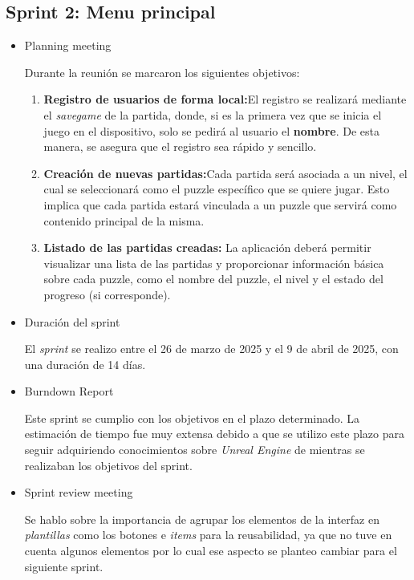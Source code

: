 \subsection{\textbf{Sprint 2: Menu principal } }
\begin{itemize}
    \item {Planning meeting}
    
    Durante la reunión se marcaron los siguientes objetivos:
    \begin{enumerate}
        \item \textbf{Registro de usuarios de forma local:}El registro se realizará mediante el \textit{savegame} de la partida, donde, si es la primera vez que se inicia el juego en el dispositivo, solo se pedirá al usuario el \textbf{nombre}. De esta manera, se asegura que el registro sea rápido y sencillo. 
    
        \item \textbf{Creación de nuevas partidas:}Cada partida será asociada a un nivel, el cual se seleccionará como el puzzle específico que se quiere jugar. Esto implica que cada partida estará vinculada a un puzzle que servirá como contenido principal de la misma. 
    
        \item \textbf{Listado de las partidas creadas:} La aplicación deberá permitir visualizar una lista de las partidas y proporcionar información básica sobre cada puzzle, como el nombre del puzzle, el nivel y el estado del progreso (si corresponde). 
    \end{enumerate}
    
    
        \item Duración del sprint
    
    El \textit{sprint } se realizo entre el 26 de marzo de 2025 y el 9 de abril de 2025, con una duración de 14 días.
    
    
        \item {Burndown Report}
    
    Este sprint se cumplio con los objetivos en el plazo determinado. La estimación de tiempo fue muy extensa debido a que se utilizo este plazo para seguir adquiriendo conocimientos sobre \textit{Unreal Engine }de mientras se realizaban los objetivos del sprint.
    
    
        \item {Sprint review meeting}
    
    Se hablo sobre la importancia de agrupar los elementos de la interfaz en \textit{plantillas} como los botones e \textit{items} para la reusabilidad, ya que no tuve en cuenta algunos elementos por lo cual ese aspecto se planteo cambiar para el siguiente sprint.
\end{itemize}

